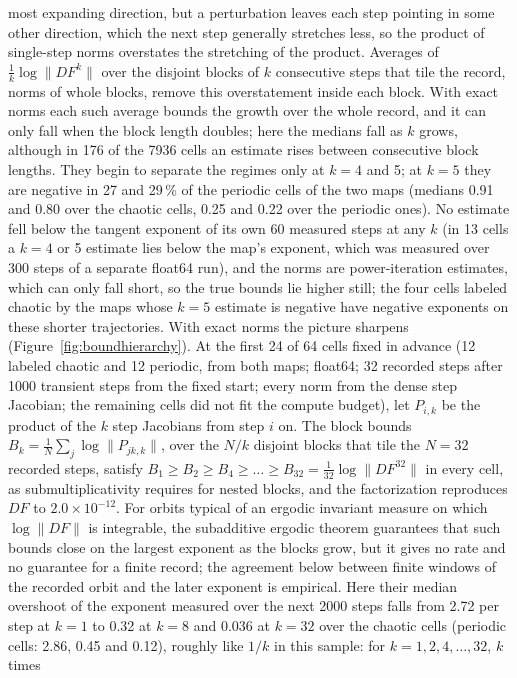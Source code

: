 \documentclass[11pt,letterpaper]{article}
\begin{document}
most expanding direction, but a perturbation leaves each step pointing in some other direction, which the next step
generally stretches less, so the product of single-step norms overstates the stretching of the product. Averages of
$\tfrac1k\log\|DF^k\|$ over the disjoint blocks of $k$ consecutive steps that tile the record, norms of whole blocks,
remove this overstatement inside each block. With exact norms each such average bounds the growth over the whole record, and it can
only fall when the block length doubles; here the medians fall as $k$ grows, although in 176 of the 7936 cells an
estimate rises between consecutive block lengths. They begin to separate the regimes only at $k=4$ and 5; at $k=5$ they are negative in 27 and
29\,\% of the periodic cells of the two maps (medians 0.91 and 0.80 over the chaotic cells, 0.25 and 0.22 over the
periodic ones). No estimate fell below the tangent exponent of its own 60 measured steps at any $k$ (in 13 cells a
$k=4$ or 5 estimate lies below the map's exponent, which was measured over 300 steps of a separate float64 run), and
the norms are power-iteration estimates,
which can only fall short, so the true bounds lie higher still; the four cells labeled chaotic by the maps whose $k=5$
estimate is negative have negative exponents on these shorter trajectories. With exact norms the picture sharpens
(Figure~\ref{fig:boundhierarchy}). At the first 24 of 64 cells fixed in advance (12 labeled chaotic and 12 periodic,
from both maps; float64; 32 recorded steps after 1000 transient steps from the fixed start; every norm from the dense
step Jacobian; the remaining cells did not fit the compute budget), let $P_{i,k}$ be the product of the $k$ step
Jacobians from step $i$ on. The block bounds $B_k=\tfrac1N\sum_j\log\|P_{jk,k}\|$, over the $N/k$ disjoint blocks that
tile the $N=32$ recorded steps, satisfy $B_1\ge B_2\ge B_4\ge\dots\ge B_{32}=\tfrac1{32}\log\|DF^{32}\|$ in every cell,
as submultiplicativity requires for nested blocks, and the factorization reproduces $DF$ to $2.0\times10^{-12}$. For orbits typical of an ergodic invariant measure on which $\log\|DF\|$ is integrable, the subadditive ergodic
theorem \cite{kingman1973subadditive} guarantees that
such bounds close on the largest exponent as the blocks grow, but it gives no rate and no guarantee for a finite
record; the agreement below between finite windows of the recorded orbit and the later exponent is empirical. Here
their median overshoot
of the exponent measured over the next 2000 steps falls from 2.72 per step at $k=1$ to 0.32 at $k=8$ and 0.036 at
$k=32$ over the chaotic cells (periodic cells: 2.86, 0.45 and 0.12), roughly like $1/k$ in this sample: for $k=1,2,4,\dots,32$, $k$ times
\end{document}
